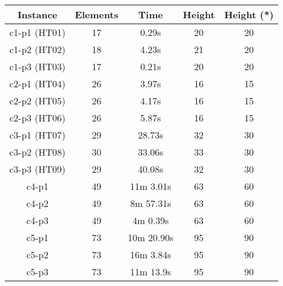 \begin{table}[h!t]
    \centering
    \small
    \begin{tabular}{|c|c|c|c|c|}
        \hline
        \textbf{Instance} & \textbf{Elements} & \textbf{Time} & \textbf{Height} & \textbf{Height (*)} \\ \hline
        c1-p1 (HT01)      & 17                & 0.29s          & 20              & 20                  \\ \hline
        c1-p2 (HT02)      & 18                & 4.23s          & 21              & 20                  \\ \hline
        c1-p3 (HT03)      & 17                & 0.21s          & 20              & 20                  \\ \hline
        c2-p1 (HT04)      & 26                & 3.97s          & 16              & 15                  \\ \hline
        c2-p2 (HT05)      & 26                & 4.17s          & 16              & 15                  \\ \hline
        c2-p3 (HT06)      & 26                & 5.87s          & 16              & 15                  \\ \hline
        c3-p1 (HT07)      & 29                & 28.73s         & 32              & 30                  \\ \hline
        c3-p2 (HT08)      & 30                & 33.06s         & 33              & 30                  \\ \hline
        c3-p3 (HT09)      & 29                & 40.08s         & 32              & 30                  \\ \hline
        c4-p1             & 49                & 11m 3.01s      & 63              & 60                  \\ \hline
        c4-p2             & 49                & 8m 57.31s      & 63              & 60                  \\ \hline
        c4-p3             & 49                & 4m 0.39s       & 63              & 60                  \\ \hline
        c5-p1             & 73                & 10m 20.90s     & 95              & 90                  \\ \hline
        c5-p2             & 73                & 16m 3.84s      & 95              & 90                  \\ \hline
        c5-p3             & 73                & 11m 13.9s      & 95              & 90                  \\ \hline

\end{tabular}
\end{table}
